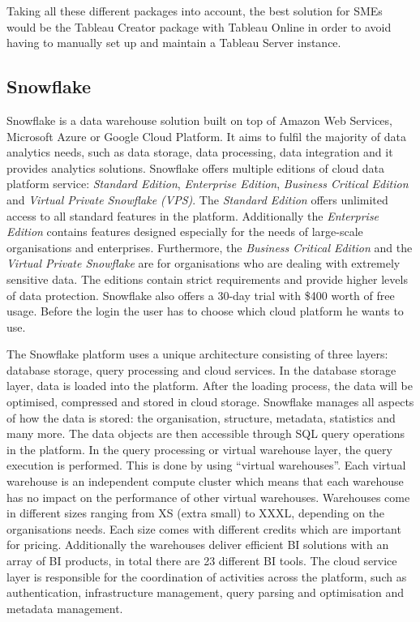 \documentclass[../paper.tex]{subfiles}
\begin{document}
Taking all these different packages into account, the best solution for SMEs
would be the Tableau Creator package with Tableau Online in order to avoid
having to manually set up and maintain a Tableau Server instance.

\subsection{Snowflake}

Snowflake is a data warehouse solution built on top of Amazon Web Services,
Microsoft Azure or Google Cloud Platform. It aims to fulfil the majority of
data analytics needs, such as data storage, data processing, data integration
and it provides analytics solutions. Snowflake offers multiple editions of
cloud data platform service: \textit{Standard Edition},
\textit{Enterprise Edition}, \textit{Business Critical Edition} and
\textit{Virtual Private Snowflake (VPS)}. The \textit{Standard Edition} offers
unlimited access to all standard features in the platform. Additionally the
\textit{Enterprise Edition} contains features designed especially for the needs
of large-scale organisations and enterprises. Furthermore, the
\textit{Business Critical Edition} and the \textit{Virtual Private Snowflake}
are for organisations who are dealing with extremely sensitive data. The
editions contain strict requirements and provide higher levels of data
protection. Snowflake also offers a 30-day trial with \$400 worth of free
usage. Before the login the user has to choose which cloud platform he wants
to use.

The Snowflake platform uses a unique architecture consisting of three layers:
database storage, query processing and cloud services. In the database storage
layer, data is loaded into the platform. After the loading process, the data
will be optimised, compressed and stored in cloud storage. Snowflake manages
all aspects of how the data is stored: the organisation, structure, metadata,
statistics and many more. The data objects are then accessible through SQL
query operations in the platform. In the query processing or virtual warehouse
layer, the query execution is performed. This is done by using “virtual
warehouses”. Each virtual warehouse is an independent compute cluster which
means that each warehouse has no impact on the performance of other virtual
warehouses. Warehouses come in different sizes ranging from XS (extra small) to
XXXL, depending on the organisations needs. Each size comes with different
credits which are important for pricing. Additionally the warehouses deliver
efficient BI solutions with an array of BI products, in total there are 23
different BI tools. The cloud service layer is responsible for the coordination
of activities across the platform, such as authentication, infrastructure
management, query parsing and optimisation and metadata management.
\end{document}
